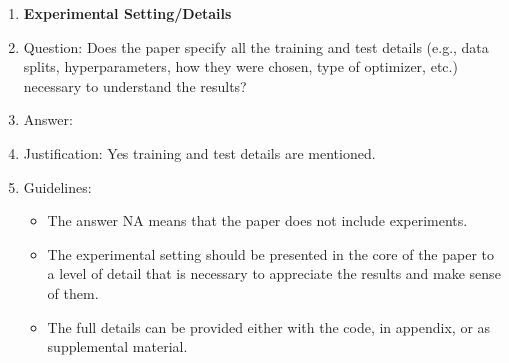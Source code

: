 \documentclass{article}
\begin{document}
\begin{enumerate}
\item {\bf Experimental Setting/Details}
    \item[] Question: Does the paper specify all the training and test details (e.g., data splits, hyperparameters, how they were chosen, type of optimizer, etc.) necessary to understand the results?
    \item[] Answer: \answerYes{} %
    \item[] Justification: Yes training and test details are mentioned. 
    \item[] Guidelines:
    \begin{itemize}
        \item The answer NA means that the paper does not include experiments.
        \item The experimental setting should be presented in the core of the paper to a level of detail that is necessary to appreciate the results and make sense of them.
        \item The full details can be provided either with the code, in appendix, or as supplemental material.
    \end{itemize}


\end{enumerate}
\end{document}
